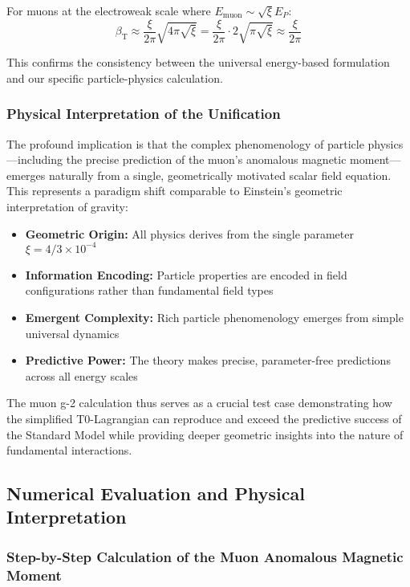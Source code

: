 \documentclass[12pt,a4paper]{article}
\newcommand{\betaT}{\beta_{\text{T}}}
\begin{document}
	For muons at the electroweak scale where $E_{\text{muon}} \sim \sqrt{\xi} E_P$:
	\begin{equation}
		\betaT \approx \frac{\xi}{2\pi} \sqrt{4\pi\sqrt{\xi}} = \frac{\xi}{2\pi} \cdot 2\sqrt{\pi\sqrt{\xi}} \approx \frac{\xi}{2\pi}
	\end{equation}
	
	This confirms the consistency between the universal energy-based formulation and our specific particle-physics calculation.
	
	\subsubsection{Physical Interpretation of the Unification}
	
	The profound implication is that the complex phenomenology of particle physics—including the precise prediction of the muon's anomalous magnetic moment—emerges naturally from a single, geometrically motivated scalar field equation. This represents a paradigm shift comparable to Einstein's geometric interpretation of gravity:
	
	\begin{itemize}
		\item \textbf{Geometric Origin:} All physics derives from the single parameter $\xi = 4/3 \times 10^{-4}$
		\item \textbf{Information Encoding:} Particle properties are encoded in field configurations rather than fundamental field types
		\item \textbf{Emergent Complexity:} Rich particle phenomenology emerges from simple universal dynamics
		\item \textbf{Predictive Power:} The theory makes precise, parameter-free predictions across all energy scales
	\end{itemize}
	
	The muon g-2 calculation thus serves as a crucial test case demonstrating how the simplified T0-Lagrangian can reproduce and exceed the predictive success of the Standard Model while providing deeper geometric insights into the nature of fundamental interactions.
	
	\subsection{Numerical Evaluation and Physical Interpretation}
	
	\subsubsection{Step-by-Step Calculation of the Muon Anomalous Magnetic Moment}
	
\end{document}
